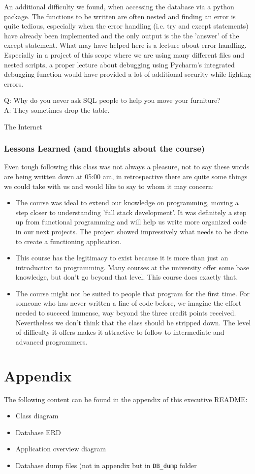 \documentclass[11pt,a4paper,notitlepage]{article}
\begin{document}
An additional difficulty we found, when accessing the database via a python package. The functions to be written are often nested and finding an error is quite tedious, especially when the error handling (i.e. try and except statements) have already been implemented and the only output is the the 'answer' of the except statement. What may have helped here is a lecture about error handling. Especially in a project of this scope where we are using many different files and nested scripts, a proper lecture about debugging using Pycharm's integrated debugging function would have provided a lot of additional security while fighting errors.

\epigraph{Q: Why do you never ask SQL people to help you move your furniture?\\ A: They sometimes drop the table.}{The Internet}

\subsubsection*{Lessons Learned (and thoughts about the course)}
Even tough following this class was not always a pleasure, not to say these words are being written down at 05:00 am, in retrospective there are quite some things we could take with us and would like to say to whom it may concern:
\begin{itemize}
\item The course was ideal to extend our knowledge on programming, moving a step closer to understanding 'full stack development'. It was definitely a step up from functional programming and will help us write more organized code in our next projects. The project showed impressively what needs to be done to create a functioning application.
\item This course has the legitimacy to exist because it is more than just an introduction to programming. Many courses at the university offer some base knowledge, but don't go beyond that level. This course does exactly that.
\item The course might not be suited to people that program for the first time. For someone who has never written a line of code before, we imagine the effort needed to succeed immense, way beyond the three credit points received. Nevertheless we don't think that the class should be stripped down. The level of difficulty it offers makes it attractive to follow to intermediate and advanced programmers. 
\end{itemize}

\section*{Appendix}
The following content can be found in the appendix of this executive README:
\begin{itemize}
\item Class diagram
\item Database ERD
\item Application overview diagram
\item Database dump files (not in appendix but in \texttt{DB\_dump} folder
\end{itemize}
\end{document}
